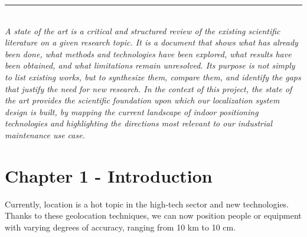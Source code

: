 \documentclass{ipgpmaster}
\begin{document}
\checkyears

\vspace*{5mm}




\def\author{Group 1}
\def\title{Research Project - State of the art}
\def\unit{Group 1}
\def\team {Rosilia MODJO, Nadia TCHUENTE, Joseph NKOULOU}
\def\supervisor{Aloys NGUEPI \& Humphrey OJONG}
\def\mydate{\today}

\Entete


\begin{abstract}
Design and prototyping of a system to locate an operator within an industrial workshop in order to automatically guide them to the equipment requiring maintenance. The solution is based on WiSLAM-type approaches, combining Wi-Fi signal strength measurements and potentially inertial sensors (FootSLAM) or visual SLAM to improve accuracy.
\end{abstract}

\vfill

\rule{\linewidth}{0.4pt}\\[3mm]
\textit{
A state of the art is a critical and structured review of the existing scientific literature on a given research topic. It is a document that shows what has already been done, what methods and technologies have been explored, what results have been obtained, and what limitations remain unresolved. Its purpose is not simply to list existing works, but to synthesize them, compare them, and identify the gaps that justify the need for new research. In the context of this project, the state of the art provides the scientific foundation upon which our localization system design is built, by mapping the current landscape of indoor positioning technologies and highlighting the directions most relevant to our industrial maintenance use case. }


\newpage
\tableofcontents
\newpage

\section{Chapter 1 - Introduction}

Currently, location is a hot topic in the high-tech sector and new technologies. Thanks to these geolocation techniques, we can now position people or equipment with varying degrees of accuracy, ranging from 10 km to 10 cm. 
\end{document}
